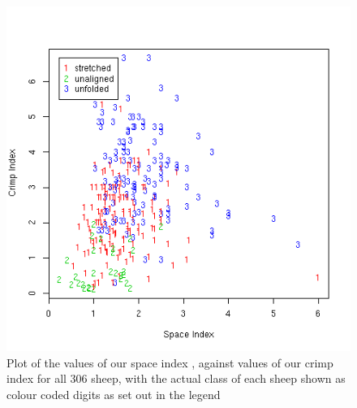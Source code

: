 %

\begin{figure}[!h]
  \centering
  \includegraphics[width=1.1\textwidth]{figspace_crimp.png}
  \caption{Plot of the values of our space index , against values of our crimp index  for all 306 sheep, with the actual class of each sheep shown as colour coded digits as set out in the legend}
  \label{fig:space_crimp}
\end{figure}

%

